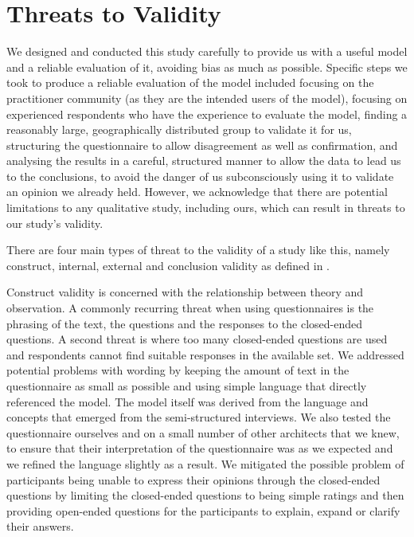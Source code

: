 \section{Threats to Validity}
\label{sec:threats}

We designed and conducted this study carefully to provide us with a useful model and a reliable evaluation of it, avoiding bias as much as possible.  Specific steps we took to produce a reliable evaluation of the model included focusing on the practitioner community (as they are the intended users of the model), focusing on experienced respondents who have the experience to evaluate the model, finding a reasonably large, geographically distributed group to validate it for us, structuring the questionnaire to allow disagreement as well as confirmation, and analysing the results in a careful, structured manner to allow the data to lead us to the conclusions, to avoid the danger of us subconsciously using it to validate an opinion we already held.  However, we acknowledge that there are potential limitations to any qualitative study, including ours, which can result in threats to our study's validity.

There are four main types of threat to the validity of a study like this, namely construct, internal, 
external and conclusion validity as defined in \cite{matt1994-threatstovalidity}. 

Construct validity is concerned with the relationship between theory and observation.  A commonly recurring threat when using questionnaires is the phrasing of the text, the questions and the responses to the closed-ended questions.  A second threat is where too many closed-ended questions are used and respondents cannot find suitable responses in the available set.  We addressed potential problems with wording by keeping the amount of text in the questionnaire as small as possible and using simple language that directly referenced the model.  The model itself was derived from the language and concepts that emerged from the semi-structured interviews.  We also tested the questionnaire ourselves and on a small number of other architects that we knew, to ensure that their interpretation of the questionnaire was as we expected and we refined the language slightly as a result.  We mitigated the possible problem of participants being unable to express their opinions through the closed-ended questions by limiting the closed-ended questions to being simple ratings and then providing open-ended questions for the participants to explain, expand or clarify their answers.


